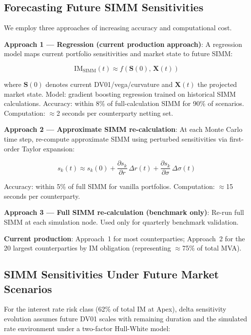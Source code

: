 \documentclass[11pt,a4paper]{article}
\begin{document}
\subsection{Forecasting Future SIMM Sensitivities}

We employ three approaches of increasing accuracy and computational cost.

\textbf{Approach 1 --- Regression (current production approach)}: A regression model maps
current portfolio sensitivities and market state to future SIMM:

\begin{equation}
\mathrm{IM}_{\mathrm{SIMM}}(t) \approx f\!\left(\mathbf{S}(0),\, \mathbf{X}(t)\right)
\tag{4}
\end{equation}

where $\mathbf{S}(0)$ denotes current DV01/vega/curvature and $\mathbf{X}(t)$ the projected
market state. Model: gradient boosting regression trained on historical SIMM calculations.
Accuracy: within 8\% of full-calculation SIMM for 90\% of scenarios. Computation: $\approx$2
seconds per counterparty netting set.

\textbf{Approach 2 --- Approximate SIMM re-calculation}: At each Monte Carlo time step,
re-compute approximate SIMM using perturbed sensitivities via first-order Taylor expansion:

\begin{equation}
s_k(t) \approx s_k(0) + \frac{\partial s_k}{\partial r}\,\Delta r(t) + \frac{\partial s_k}{\partial\sigma}\,\Delta\sigma(t)
\tag{5}
\end{equation}

Accuracy: within 5\% of full SIMM for vanilla portfolios. Computation: $\approx$15 seconds per
counterparty.

\textbf{Approach 3 --- Full SIMM re-calculation (benchmark only)}: Re-run full SIMM at each
simulation node. Used only for quarterly benchmark validation.

\textbf{Current production}: Approach~1 for most counterparties; Approach~2 for the 20 largest
counterparties by IM obligation (representing $\approx$75\% of total MVA).

\subsection{SIMM Sensitivities Under Future Market Scenarios}

For the interest rate risk class (62\% of total IM at Apex), delta sensitivity evolution
assumes future DV01 scales with remaining duration and the simulated rate environment under a
two-factor Hull-White model:
\end{document}
